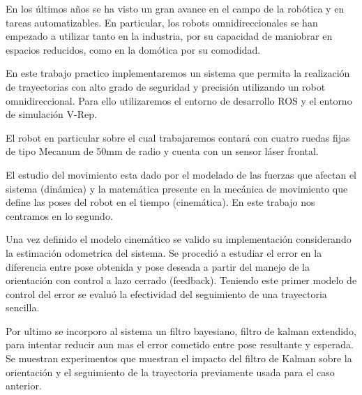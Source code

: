 En los últimos años se ha visto un gran avance en el campo de la robótica y en tareas automatizables. En particular, los robots omnidireccionales se han empezado a utilizar tanto en la industria, por su capacidad de maniobrar en espacios reducidos, como en la domótica por su comodidad.

En este trabajo practico implementaremos un sistema que permita la realización de trayectorias con alto grado de seguridad y precisión utilizando un robot omnidireccional. Para ello utilizaremos el entorno de desarrollo ROS y el entorno de simulación V-Rep.

El robot en particular sobre el cual trabajaremos contará con cuatro ruedas fijas de tipo Mecanum de 50mm de radio y cuenta con un sensor láser frontal. 

El estudio del movimiento esta dado por el modelado de las fuerzas que afectan el sistema (dinámica) y la matemática presente en la mecánica de movimiento que define las poses del robot en el tiempo (cinemática). En este trabajo nos centramos en lo segundo.

Una vez definido el modelo cinemático se valido su implementación considerando la estimación odometrica del sistema. Se procedió a estudiar el error en la diferencia entre pose obtenida y pose deseada a partir del manejo de la orientación con control a lazo cerrado (feedback). Teniendo este primer modelo de control del error se evaluó la efectividad del seguimiento de una trayectoria sencilla.

Por ultimo se incorporo al sistema un filtro bayesiano, filtro de kalman extendido, para intentar reducir aun mas el error cometido entre pose resultante y esperada. Se muestran experimentos que muestran el impacto del filtro de Kalman sobre la orientación y el seguimiento de la trayectoria previamente usada para el caso anterior.   



